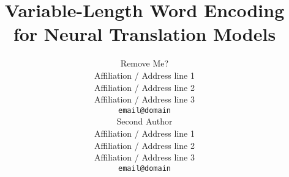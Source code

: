 \documentclass[11pt]{article}
\title{Variable-Length Word Encoding for Neural Translation Models}
\author{Remove Me? \\
 Affiliation / Address line 1 \\
 Affiliation / Address line 2 \\
 Affiliation / Address line 3 \\
 {\tt email@domain} \\\And
 Second Author \\
 Affiliation / Address line 1 \\
 Affiliation / Address line 2 \\
 Affiliation / Address line 3 \\
 {\tt email@domain} \\}
\begin{document}
\maketitle
\begin{abstract}

\end{abstract}







\newpage

\end{document}

